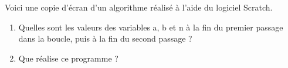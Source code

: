 \begin{exercice}[CRPE 2018 G1] %
   \begin{minipage}{8cm}
      Voici une copie d’écran d’un algorithme réalisé à l’aide du logiciel Scratch. \\
      \begin{enumerate}
         \item Quelles sont les valeurs des variables a, b et n à la fin du premier passage dans la boucle, puis à la fin du second passage ?
         \item Que réalise ce programme ?
      \end{enumerate}
   \end{minipage}
   \hspace*{2cm}
   \begin{minipage}{7cm}
         \begin{scratch}
               {
               }
         \end{scratch}
   \end{minipage}
\end{exercice}

